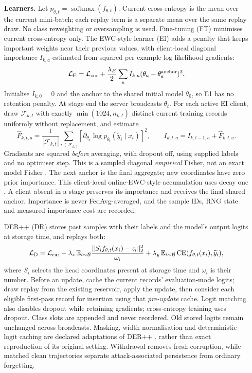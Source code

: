 \documentclass[10pt,a4paper]{article}
\newcommand{\CE}{\operatorname{CE}}
\begin{document}
\textbf{Learners.} Let $p_{\theta,t}=\operatorname{softmax}(f_{\theta,t})$. Current cross-entropy is the mean over the current mini-batch; each replay term is a separate mean over the same replay draw. No class reweighting or oversampling is used. Fine-tuning (FT) minimises current cross-entropy only. The EWC-style learner (EI) adds a penalty that keeps important weights near their previous values, with client-local diagonal importance $I_{k,a}$ estimated from squared per-example log-likelihood gradients:
\begin{equation}
\mathcal L_{\rm E}=\mathcal L_{\rm cur}+\frac{\lambda_E}{2}\sum_aI_{k,a}(\theta_a-\theta_a^{\rm anchor})^2 .
\label{eq:ewc}
\end{equation}
Initialise $I_{k,0}=0$ and the anchor to the shared initial model $\theta_0$, so E1 has no retention penalty. At stage end the server broadcasts $\theta_t$. For each active EI client, draw $\mathcal F_{k,t}$ with exactly $\min(1024,n_{k,t})$ distinct current training records uniformly without replacement, and estimate
\begin{equation}
\widehat F_{k,t,a}=\frac{1}{|\mathcal F_{k,t}|}\sum_{i\in\mathcal F_{k,t}}
\left[\partial_{\theta_a}\log p_{\theta_t}(\widetilde y_i\mid x_i)\right]^2,
\qquad I_{k,t,a}=I_{k,t-1,a}+\widehat F_{k,t,a}.
\label{eq:importance}
\end{equation}
Gradients are squared \emph{before} averaging, with dropout off, using supplied labels and no optimiser step. This is a sampled diagonal \emph{empirical} Fisher, not an exact model Fisher \cite{ewc,empfisher}. The next anchor is the final aggregate; new coordinates have zero prior importance. This client-local online-EWC-style accumulation uses decay one \cite{onlineewc}. A client absent in a stage preserves its importance and receives the final shared anchor. Importance is never FedAvg-averaged, and the sample IDs, RNG state and measured importance cost are recorded.

DER++ (DR) stores past samples with their labels and the model's output logits at storage time, and replays both:
\begin{equation}
\mathcal L_{\rm D}=\mathcal L_{\rm cur}
+\lambda_z\,\mathbb E_{i\sim\mathcal B}\frac{\|S_if_{\theta,t}(x_i)-z_i\|_2^2}{\omega_i}
+\lambda_y\,\mathbb E_{i\sim\mathcal B}\CE(f_{\theta,t}(x_i),\widetilde y_i),
\label{eq:der}
\end{equation}
where $S_i$ selects the head coordinates present at storage time and $\omega_i$ is their number. Before an update, cache the current records' evaluation-mode logits; draw replay from the existing reservoir, apply the update, then consider each eligible first-pass record for insertion using that \emph{pre-update} cache. Logit matching also disables dropout while retaining gradients; cross-entropy training uses dropout. Class slots are appended and never reordered. Old stored logits remain unchanged across broadcasts. Masking, width normalisation and deterministic logit caching are declared adaptations of DER++ \cite{der}, rather than exact reproduction of its original setting. Withdrawal removes fresh corruption, while matched clean trajectories separate attack-associated persistence from ordinary forgetting.
\end{document}
